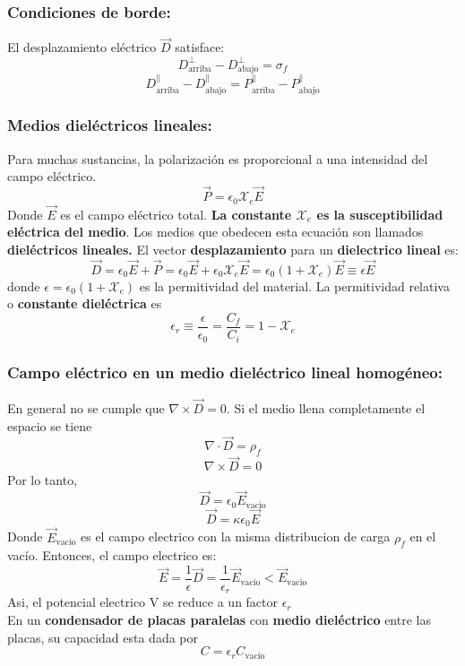 \documentclass[a4paper, 10pt]{article}
\begin{document}
\begin{multicols*}{2}
	\subsubsection{Condiciones de borde:} El desplazamiento eléctrico $\vec{D}$ satisface:
	$$D_{\text{arriba}}^{\perp} - D_{\text{abajo}}^{\perp}=\sigma _f$$
	$$D_{\text{arriba}}^{\parallel} - D_{\text{abajo}}^{\parallel}=P_{\text{arriba}}^{\parallel} - P_{\text{abajo}}^{\parallel}$$
	    
	\subsubsection{Medios dieléctricos lineales: }Para muchas sustancias, la polarización es proporcional a una intensidad del campo eléctrico.
	$$\vec{P} = \epsilon_0 \mathcal{X}_e \vec{E}$$
	Donde $\vec{E}$ es el campo eléctrico total. \textbf{La constante $\mathcal{X}_e$ es la susceptibilidad eléctrica del medio}.
	Los medios que obedecen esta ecuación son llamados \textbf{dieléctricos lineales.}
	El vector \textbf{desplazamiento} para un \textbf{dielectrico lineal} es:
	$$\vec{D}= \epsilon_0\vec{E}+ \vec{P} = \epsilon_0\vec{E}+ \epsilon_0\mathcal{X}_e\vec{E}= \epsilon_0(1+\mathcal{X}_e)\vec{E}\equiv \epsilon\vec{E}$$
	donde $\epsilon =\epsilon_0(1+\mathcal{X}_e)$ es la permitividad del material.
	La permitividad relativa o \textbf{constante dieléctrica} es
	$$\epsilon_r \equiv \frac{\epsilon}{\epsilon_0}= \frac{C_f}{C_i} = 1 -\mathcal{X}_e$$
	     
	\subsubsection{Campo eléctrico en un medio dieléctrico lineal homogéneo: }En general no se cumple que $\nabla \times \vec{D}=0$. Si el medio llena completamente el espacio se tiene $$\nabla \cdot \vec{D}=\rho _f$$
	$$\nabla \times \vec{D}=0$$
	Por lo tanto, 
	$$\vec{D}= \epsilon_0 \vec{E}_{\text{vacio}}$$
	$$\vec{D}=\kappa \epsilon_0 \vec{E}$$
	Donde $\vec{E}_{\text{vacio}}$ es el campo electrico con la misma distribucion de carga $\rho_f$ en el vacío.
	Entonces, el campo electrico es:
	$$\vec{E}= \frac{1}{\epsilon}\vec{D}= \frac{1}{\epsilon_r}\vec{E}_{\text{vacío}} < \vec{E}_{\text{vacio}}$$
	Asi, el potencial electrico V se reduce a un factor $\epsilon_r$\\
	En un \textbf{condensador de placas paralelas } 
  con \textbf{medio dieléctrico} entre las placas, su capacidad esta dada por 
  $$C = \epsilon _r C_{\text{vacío}}$$
	    

\end{multicols*}
\end{document}

